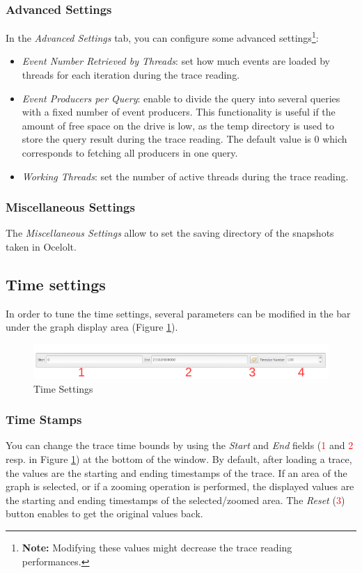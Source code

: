 \documentclass[twoside]{article}
\begin{document}
\begin{sloppypar}
\subsubsection{Advanced Settings}
In the \textit{Advanced Settings} tab, you can configure some advanced settings\footnote{\textbf{Note:} Modifying these values might decrease the trace reading performances.}:
\begin{itemize}
	\item \textit{Event Number Retrieved by Threads}: set how much events are loaded by threads for each iteration during the trace reading.
	\item \textit{Event Producers per Query}: enable to divide the query into several queries with a fixed number of event producers. This functionality is useful if the amount of free space on the drive is low, as the temp directory is used to store the query result during the trace reading. The default value is 0 which corresponds to fetching all producers in one query.
	\item \textit{Working Threads}: set the number of active threads during the trace reading. 
\end{itemize}

\subsubsection{Miscellaneous Settings}
The \textit{Miscellaneous Settings} allow to set the saving directory of the snapshots taken in Ocelolt.

\subsection{Time settings}
In order to tune the time settings, several parameters can be modified in the bar under the graph display area (Figure \ref{timeSettings}).
 
\begin{figure}[h!]
	\centering
	\includegraphics[width=1.0\textwidth]{images/ocelotl_bottom_time.pdf}
	\caption{Time Settings}
	\label{timeSettings}
\end{figure}

\subsubsection{Time Stamps}
You can change the trace time bounds by using the \textit{Start} and \textit{End} fields (\textcolor{red}{1} and \textcolor{red}{2} resp. in Figure \ref{timeSettings}) at the bottom of the window. By default, after loading a trace, the values are the starting and ending timestamps of the trace. If an area of the graph is selected, or if a zooming operation is performed, the displayed values are the starting and ending timestamps of the selected/zoomed area. The \textit{Reset} (\textcolor{red}{3}) button enables to get the original values back.


\end{sloppypar}
\end{document}
